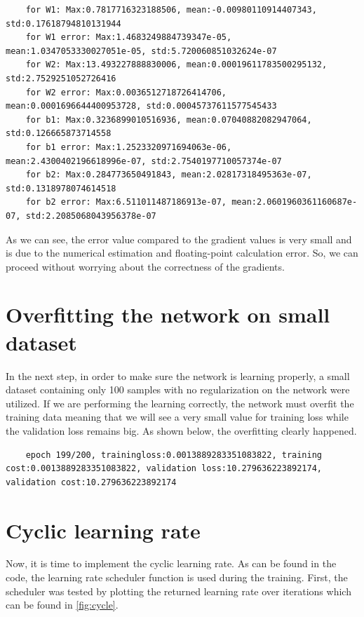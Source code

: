 \documentclass[a4paper]{article}
\begin{document}
\begin{lstlisting}
	for W1: Max:0.7817716323188506, mean:-0.00980110914407343, std:0.17618794810131944 
	for W1 error: Max:1.4683249884739347e-05, mean:1.0347053330027051e-05, std:5.720060851032624e-07
	for W2: Max:13.493227888830006, mean:0.00019611783500295132, std:2.7529251052726416 
	for W2 error: Max:0.0036512718726414706, mean:0.0001696644400953728, std:0.00045737611577545433
	for b1: Max:0.3236899010516936, mean:0.07040882082947064, std:0.126665873714558 
	for b1 error: Max:1.2523320971694063e-06, mean:2.4300402196618996e-07, std:2.7540197710057374e-07
	for b2: Max:0.284773650491843, mean:2.02817318495363e-07, std:0.1318978074614518 
	for b2 error: Max:6.511011487186913e-07, mean:2.0601960361160687e-07, std:2.2085068043956378e-07
\end{lstlisting}

As we can see, the error value compared to the gradient values is very small and is due to the numerical estimation and floating-point calculation error. So, we can proceed without worrying about the correctness of the gradients.

\section{Overfitting the network on small dataset}

In the next step, in order to make sure the network is learning properly, a small dataset containing only 100 samples with no regularization on the network were utilized. If we are performing the learning correctly, the network must overfit the training data meaning that we will see a very small value for training loss while the validation loss remains big. As shown below, the overfitting clearly happened.

\begin{lstlisting}
	epoch 199/200, trainingloss:0.0013889283351083822, training cost:0.0013889283351083822, validation loss:10.279636223892174, validation cost:10.279636223892174
\end{lstlisting}


\section{Cyclic learning rate}

Now, it is time to implement the cyclic learning rate. As can be found in the code, the learning rate scheduler function is used during the training. First, the scheduler was tested by plotting the returned learning rate over iterations which can be found in \autoref{fig:cycle}.
\end{document}
